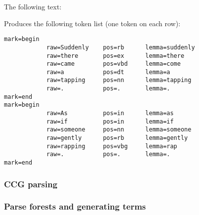 \documentclass[main.tex]{subfiles}
\begin{document}
\begin{example}
    The following text:
    \begin{center}
    \end{center}
    
    Produces the following token list (one token on each row):
\begin{lstlisting}
mark=begin
            raw=Suddenly    pos=rb      lemma=suddenly
            raw=there       pos=ex      lemma=there
            raw=came        pos=vbd     lemma=come
            raw=a           pos=dt      lemma=a
            raw=tapping     pos=nn      lemma=tapping
            raw=.           pos=.       lemma=.
mark=end
mark=begin
            raw=As          pos=in      lemma=as
            raw=if          pos=in      lemma=if
            raw=someone     pos=nn      lemma=someone
            raw=gently      pos=rb      lemma=gently
            raw=rapping     pos=vbg     lemma=rap
            raw=.           pos=.       lemma=.
mark=end   
\end{lstlisting}
\end{example}
\subsubsection{CCG parsing}
\subsubsection{Parse forests and generating terms}\label{sec:termgen}
\end{document}
